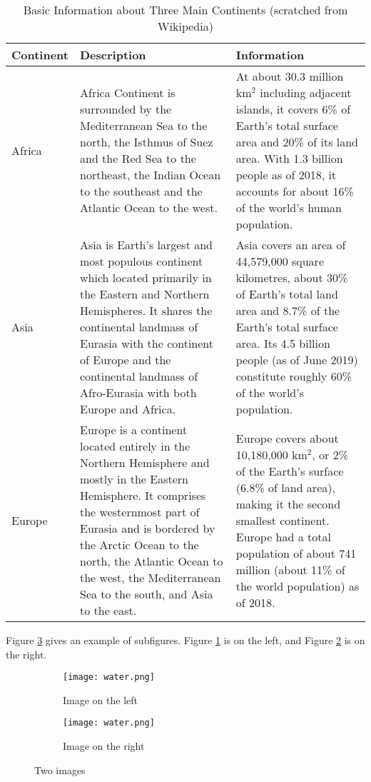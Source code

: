 \documentclass[12pt]{article}  %
\begin{document}
\begin{longtable}{ p{4em} p{14em} p{14em} }
\caption{Basic Information about Three Main Continents (scratched from Wikipedia)}
\label{tb:longtable}\\
\toprule
Continent & Description & Information \\
\midrule
Africa & Africa Continent is surrounded by the Mediterranean Sea to the
north, the Isthmus of Suez and the Red Sea to the northeast, the Indian
Ocean to the southeast and the Atlantic Ocean to the west. &
At about 30.3 million km$^2$ including adjacent islands, it covers 6\%
of Earth's total surface area and 20\% of its land area. With 1.3
billion people as of 2018, it accounts for about 16\% of the world's
human population. \\
\midrule
Asia & Asia is Earth's largest and most populous continent which
located primarily in the Eastern and Northern Hemispheres.
It shares the continental landmass of Eurasia with the continent
of Europe and the continental landmass of Afro-Eurasia with both
Europe and Africa. &
Asia covers an area of 44,579,000 square kilometres, about 30\%
of Earth's total land area and 8.7\% of the Earth's total surface
area. Its 4.5 billion people (as of June 2019) constitute roughly
60\% of the world's population. \\
\midrule
Europe & Europe is a continent located entirely in the Northern
Hemisphere and mostly in the Eastern Hemisphere. It comprises the
westernmost part of Eurasia and is bordered by the Arctic Ocean to
the north, the Atlantic Ocean to the west, the Mediterranean Sea to
the south, and Asia to the east. &
Europe covers about 10,180,000 km$^2$, or 2\% of the Earth's surface
(6.8\% of land area), making it the second smallest
continent. Europe had a total population of about 741 million (about
11\% of the world population) as of 2018. \\
\bottomrule

\end{longtable}

Figure \ref{fig:subfigures} gives an example of subfigures. Figure \ref{subfig:left} is on the left, and Figure \ref{subfig:right} is on the right.

\begin{figure}[htbp]
\centering
\begin{subfigure}[b]{.4\textwidth}
\texttt{[image: water.png]}
\caption{Image on the left}\label{subfig:left}
\end{subfigure}
\begin{subfigure}[b]{.4\textwidth}
\texttt{[image: water.png]}
\caption{Image on the right}\label{subfig:right}
\end{subfigure}
\caption{Two images}\label{fig:subfigures}
\end{figure}
\end{document}
